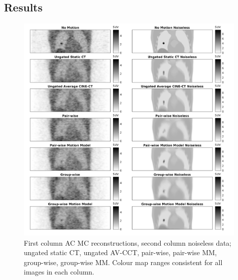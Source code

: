 \documentclass[misc, color=UCLburgundy, margin=1cm]{uclposter}
\begin{document}
\begin{multicols}{4}
        \section*{Results}
            \begin{figure}[H]
                \centering
                \includegraphics[width=0.9\linewidth]{visual_analysis.png}
                \begin{highlightbox}[UCLlightblue]
                    \captionsetup{singlelinecheck=false, justification=centering}
                    \caption{First column \gls{AC} \gls{MC} reconstructions, second column noiseless data; ungated static \gls{CT}, ungated \gls{AV-CCT}, pair-wise, pair-wise \gls{MM}, group-wise, group-wise \gls{MM}. Colour map ranges consistent for all images in each column.}
                \end{highlightbox}
            \end{figure}
            

\end{multicols}
\end{document}
